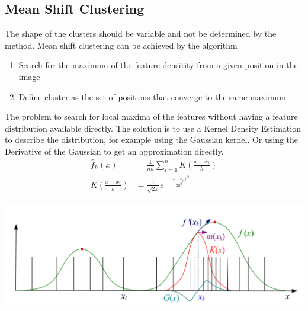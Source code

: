 \subsection{Mean Shift Clustering}
The shape of the clusters should be variable and not be determined by the method. Mean shift clustering can be achieved by the algorithm
\begin{enumerate}
	\item Search for the maximum of the feature densitity from a given position in the image
	\item Define cluster as the set of positions that converge to the same maximum
\end{enumerate}
The problem to search for local maxima of the features without having a feature distribution available directly.
The solution is to use a Kernel Density Estimation to describe the distribution, for example using the Gaussian kernel.
Or using the Derivative of the Gaussian to get an approximation directly.
\begin{align*}
	\hat{f}_h(x) &= \frac{1}{nh}\sum_{i=1}^{n}K\left(\frac{x-x_i}{h}\right)\\
	K\left(\frac{x-x_i}{h}\right) &= \frac{1}{\sqrt{2\pi}} e^{-\frac{(x-x_i)^2}{2h^2}}
\end{align*}
\begin{center}
	\includegraphics[width=0.7\linewidth]{img/kernel_density_estimation}
\end{center}

